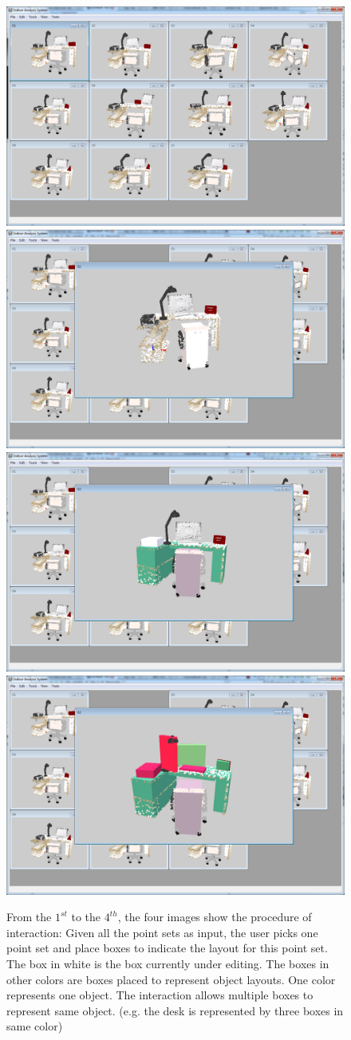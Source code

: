 \begin{figure}
	\centering
	\includegraphics[width=.45\linewidth]{images/interact/01.png}
	\includegraphics[width=.45\linewidth]{images/interact/02.png}
	\includegraphics[width=.45\linewidth]{images/interact/03.png}
	\includegraphics[width=.45\linewidth]{images/interact/06.png}
	\caption{\label{fig:interact}
		From the $1^{st}$ to the $4^{th}$, the four images show the procedure of interaction:
		Given all the point sets as input, the user picks one point set and place boxes to indicate the layout for this point set. The box in white is the box currently under editing. The boxes in other colors are boxes placed to represent object layouts. One color represents one object. The interaction allows multiple boxes to represent same object. (e.g. the desk is represented by three boxes in same color)}
\end{figure}

